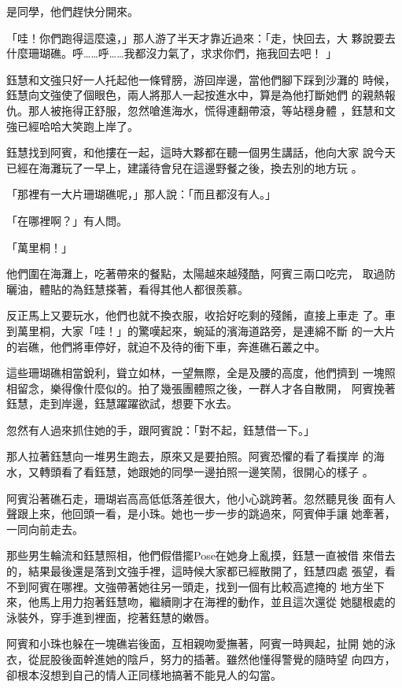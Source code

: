 是同學，他們趕快分開來。

「哇！你們跑得這麼遠，」那人游了半天才靠近過來：「走，快回去，大
夥說要去什麼珊瑚礁。呼……呼……我都沒力氣了，求求你們，拖我回去吧！
」

鈺慧和文強只好一人托起他一條臂膀，游回岸邊，當他們腳下踩到沙灘的
時候，鈺慧向文強使了個眼色，兩人將那人一起按進水中，算是為他打斷她們
的親熱報仇。那人被拖得正舒服，忽然嗆進海水，慌得連翻帶滾，等站穩身體
，鈺慧和文強已經哈哈大笑跑上岸了。

鈺慧找到阿賓，和他摟在一起，這時大夥都在聽一個男生講話，他向大家
說今天已經在海灘玩了一早上，建議待會兒在這邊野餐之後，換去別的地方玩
。

「那裡有一大片珊瑚礁呢，」那人說：「而且都沒有人。」

「在哪裡啊？」有人問。

「萬里桐！」

他們圍在海灘上，吃著帶來的餐點，太陽越來越殘酷，阿賓三兩口吃完，
取過防曬油，體貼的為鈺慧搽著，看得其他人都很羨慕。

反正馬上又要玩水，他們也就不換衣服，收拾好吃剩的殘餚，直接上車走
了。車到萬里桐，大家「哇！」的驚嘆起來，蜿延的濱海道路旁，是連綿不斷
的一大片的岩礁，他們將車停好，就迫不及待的衝下車，奔進礁石叢之中。

這些珊瑚礁相當銳利，聳立如林，一望無際，全是及腰的高度，他們擠到
一塊照相留念，樂得像什麼似的。拍了幾張團體照之後，一群人才各自散開，
阿賓挽著鈺慧，走到岸邊，鈺慧躍躍欲試，想要下水去。

忽然有人過來抓住她的手，跟阿賓說：「對不起，鈺慧借一下。」

那人拉著鈺慧向一堆男生跑去，原來又是要拍照。阿賓恐懼的看了看撲岸
的海水，又轉頭看了看鈺慧，她跟她的同學一邊拍照一邊笑鬧，很開心的樣子
。

阿賓沿著礁石走，珊瑚岩高高低低落差很大，他小心跳跨著。忽然聽見後
面有人聲跟上來，他回頭一看，是小珠。她也一步一步的跳過來，阿賓伸手讓
她牽著，一同向前走去。

那些男生輪流和鈺慧照相，他們假借擺Pose在她身上亂摸，鈺慧一直被借
來借去的，結果最後還是落到文強手裡，這時候大家都已經散開了，鈺慧四處
張望，看不到阿賓在哪裡。文強帶著她往另一頭走，找到一個有比較高遮掩的
地方坐下來，他馬上用力抱著鈺慧吻，繼續剛才在海裡的動作，並且這次還從
她腿根處的泳裝外，穿手進到裡面，挖著鈺慧的嫩唇。

阿賓和小珠也躲在一塊礁岩後面，互相親吻愛撫著，阿賓一時興起，扯開
她的泳衣，從屁股後面幹進她的陰戶，努力的插著。雖然他懂得警覺的隨時望
向四方，卻根本沒想到自己的情人正同樣地搞著不能見人的勾當。

